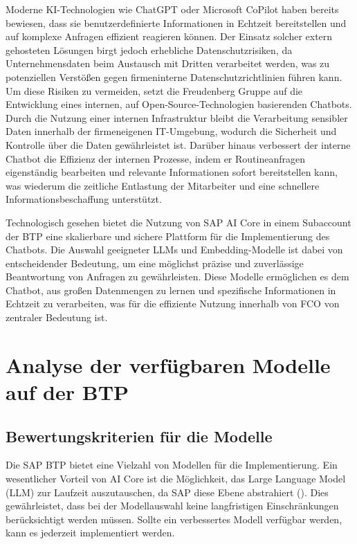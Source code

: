 Moderne \ac{KI}-Technologien wie ChatGPT oder Microsoft CoPilot haben bereits bewiesen, dass sie benutzerdefinierte Informationen in Echtzeit bereitstellen und auf komplexe Anfragen effizient reagieren können. 
Der Einsatz solcher extern gehosteten Lösungen birgt jedoch erhebliche Datenschutzrisiken, da Unternehmensdaten beim Austausch mit Dritten verarbeitet werden, 
was zu potenziellen Verstößen gegen firmeninterne Datenschutzrichtlinien führen kann. 
Um diese Risiken zu vermeiden, setzt die Freudenberg Gruppe auf die Entwicklung eines internen, auf Open-Source-Technologien basierenden Chatbots. 
Durch die Nutzung einer internen Infrastruktur bleibt die Verarbeitung sensibler Daten innerhalb der firmeneigenen IT-Umgebung, wodurch die Sicherheit und Kontrolle über die Daten gewährleistet ist. 
Darüber hinaus verbessert der interne Chatbot die Effizienz der internen Prozesse, indem er Routineanfragen eigenständig bearbeiten und relevante Informationen sofort bereitstellen kann, 
was wiederum die zeitliche Entlastung der Mitarbeiter und eine schnellere Informationsbeschaffung unterstützt.

Technologisch gesehen bietet die Nutzung von SAP AI Core in einem Subaccount der \ac{BTP} eine skalierbare und sichere Plattform für die Implementierung des Chatbots. 
Die Auswahl geeigneter \acp{LLM} und Embedding-Modelle ist dabei von entscheidender Bedeutung, um eine möglichst präzise und zuverlässige Beantwortung von Anfragen zu gewährleisten. 
Diese Modelle ermöglichen es dem Chatbot, aus großen Datenmengen zu lernen und spezifische Informationen in Echtzeit zu verarbeiten, was für die effiziente Nutzung innerhalb von \ac{FCO} von zentraler Bedeutung ist.

\section{Analyse der verfügbaren Modelle auf der BTP}
\subsection{Bewertungskriterien für die Modelle}

Die SAP \ac{BTP} bietet eine Vielzahl von Modellen für die Implementierung. Ein wesentlicher Vorteil von AI Core ist die Möglichkeit, das Large Language Model (\ac{LLM}) zur Laufzeit auszutauschen, da SAP diese Ebene abstrahiert (\cite{sap2024aiCore}). 
Dies gewährleistet, dass bei der Modellauswahl keine langfristigen Einschränkungen berücksichtigt werden müssen. Sollte ein verbessertes Modell verfügbar werden, kann es jederzeit implementiert werden.

